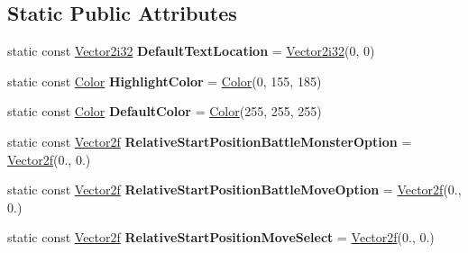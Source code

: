 \subsection*{Static Public Attributes}
\begin{DoxyCompactItemize}
\item 
\mbox{\label{classmonsterbattle_1_1DisplayableTextManager_a628800f106b83db4a0acb93ba29ad060}} 
static const \hyperlink{structmonsterbattle_1_1Vector}{Vector2i32} {\bfseries Default\+Text\+Location} = \hyperlink{structmonsterbattle_1_1Vector}{Vector2i32}(0, 0)
\item 
\mbox{\label{classmonsterbattle_1_1DisplayableTextManager_ae7cebf530fe74249bb441e30e098687f}} 
static const \hyperlink{structmonsterbattle_1_1Color}{Color} {\bfseries Highlight\+Color} = \hyperlink{structmonsterbattle_1_1Color}{Color}(0, 155, 185)
\item 
\mbox{\label{classmonsterbattle_1_1DisplayableTextManager_aa484f5de8baadf1e1ea73df495458b6e}} 
static const \hyperlink{structmonsterbattle_1_1Color}{Color} {\bfseries Default\+Color} = \hyperlink{structmonsterbattle_1_1Color}{Color}(255, 255, 255)
\item 
\mbox{\label{classmonsterbattle_1_1DisplayableTextManager_ab30a177bd47770a75d4b46afce2d811f}} 
static const \hyperlink{structmonsterbattle_1_1Vector}{Vector2f} {\bfseries Relative\+Start\+Position\+Battle\+Monster\+Option} = \hyperlink{structmonsterbattle_1_1Vector}{Vector2f}(0., 0.)
\item 
\mbox{\label{classmonsterbattle_1_1DisplayableTextManager_a7bf058c5efb5b0cdbb4baa8b8bd9a6a4}} 
static const \hyperlink{structmonsterbattle_1_1Vector}{Vector2f} {\bfseries Relative\+Start\+Position\+Battle\+Move\+Option} = \hyperlink{structmonsterbattle_1_1Vector}{Vector2f}(0., 0.)
\item 
\mbox{\label{classmonsterbattle_1_1DisplayableTextManager_a483710fcf5c8dc7bb39911993f41c85e}} 
static const \hyperlink{structmonsterbattle_1_1Vector}{Vector2f} {\bfseries Relative\+Start\+Position\+Move\+Select} = \hyperlink{structmonsterbattle_1_1Vector}{Vector2f}(0., 0.)

\end{DoxyCompactItemize}
